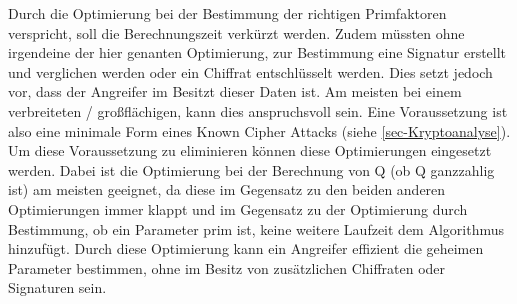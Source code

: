         Durch die Optimierung bei der Bestimmung der richtigen Primfaktoren verspricht, soll die Berechnungszeit verkürzt werden. Zudem müssten ohne irgendeine der hier genanten Optimierung, zur Bestimmung eine Signatur erstellt und verglichen werden oder ein Chiffrat entschlüsselt werden. Dies setzt jedoch vor, dass der Angreifer im Besitzt dieser Daten ist. Am meisten bei einem verbreiteten / großflächigen, kann dies anspruchsvoll sein. Eine Voraussetzung ist also eine minimale Form eines Known Cipher Attacks (siehe \ref{sec-Kryptoanalyse}).
        Um diese Voraussetzung zu eliminieren können diese Optimierungen eingesetzt werden. 
        Dabei ist die Optimierung bei der Berechnung von Q (ob Q ganzzahlig ist) am meisten geeignet, da diese im Gegensatz zu den beiden anderen Optimierungen immer klappt und im Gegensatz zu der Optimierung durch Bestimmung, ob ein Parameter prim ist, keine weitere Laufzeit dem Algorithmus hinzufügt.
        Durch diese Optimierung kann ein Angreifer effizient die geheimen Parameter bestimmen, ohne im Besitz von zusätzlichen Chiffraten oder Signaturen sein.
             
    
